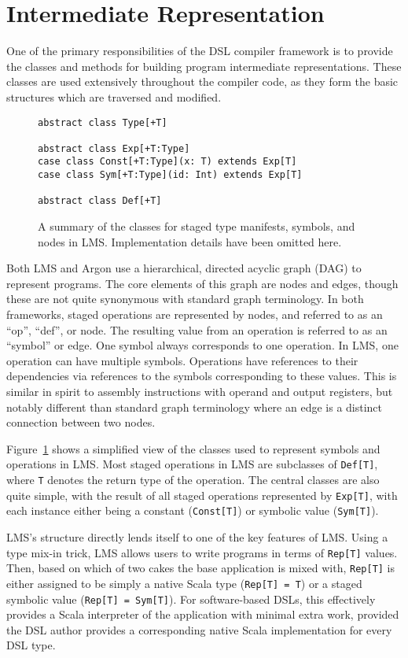 \section{Intermediate Representation}
One of the primary responsibilities of the DSL compiler framework is to provide the classes and methods for building program intermediate
representations. These classes are used extensively throughout the compiler
code, as they form the basic structures which are traversed and modified.

\begin{figure}
\begin{lstlisting}[language=ScalaBig]
abstract class Type[+T]

abstract class Exp[+T:Type]
case class Const[+T:Type](x: T) extends Exp[T]
case class Sym[+T:Type](id: Int) extends Exp[T]

abstract class Def[+T]
\end{lstlisting}
\caption{A summary of the classes for staged type manifests, symbols, and nodes in LMS. Implementation details have been omitted here.}
\label{fig:lms-ir}
\end{figure}


Both LMS and Argon use a hierarchical, directed acyclic graph (DAG) to represent programs. The core elements of this graph are nodes and edges,
though these are not quite synonymous with standard graph terminology.
In both frameworks, staged operations are represented by nodes, and referred to as an ``op'', ``def'', or node. The resulting value from an operation
is referred to as an ``symbol'' or edge. One symbol always corresponds to
one operation. In LMS, one operation can have multiple symbols.
Operations have references to their dependencies via
references to the symbols corresponding to these
values. This is similar in spirit to
assembly instructions with operand and output registers, but notably different
than standard graph terminology where an edge is a distinct connection between two nodes.

Figure~\ref{fig:lms-ir} shows a simplified view of the classes
used to represent symbols and operations in LMS.
Most staged operations in LMS are subclasses of \texttt{Def[T]}, where
\texttt{T} denotes the return type of the operation.
The central classes are also quite simple, with the result of all staged operations represented by \texttt{Exp[T]}, with each instance either being a
constant (\texttt{Const[T]}) or symbolic value (\texttt{Sym[T]}).

LMS's structure directly lends itself to one of the key features of LMS.
Using a type mix-in trick, LMS allows users to write programs in
terms of \texttt{Rep[T]} values. Then, based on which of two cakes the
base application is mixed with, \texttt{Rep[T]} is either assigned to be
simply a native Scala type (\texttt{Rep[T] = T}) or a staged symbolic value (\texttt{Rep[T] = Sym[T]}).
For software-based DSLs, this effectively provides a Scala interpreter
of the application with minimal extra work, provided the DSL author
provides a corresponding native Scala implementation for every DSL type.

